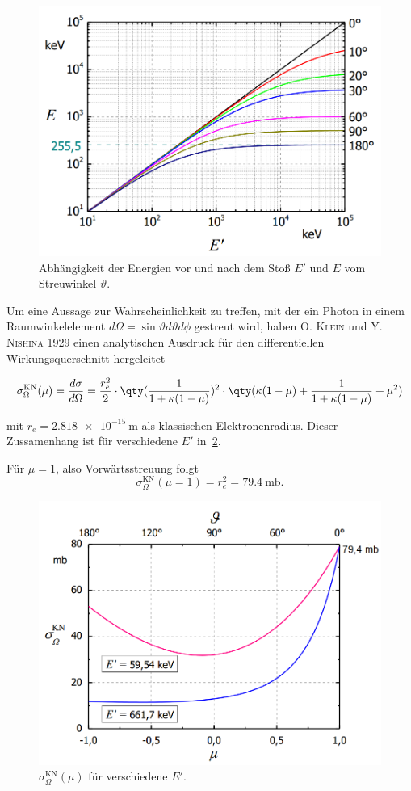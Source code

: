 \documentclass[slug=CS, room=Andreas-Schubert-Bau\,\ Labor\ 406,
supervisor=Juliane\ Volkmer, coursedate=29.\ 11.\ 2019]{../../Lab_Report_LaTeX/lab_report}
\begin{document}
\begin{figure}[H]\centering
        \includegraphics[width=.5\columnwidth]{./pictures/evontheta.png}
        \caption{Abhängigkeit der Energien vor und nach dem Stoß \(E'\) und \(E\) vom Streuwinkel
        \(\vartheta\).}
        \label{fig:evontheta}
\end{figure}

Um eine Aussage zur Wahrscheinlichkeit zu treffen, mit der ein Photon in einem Raumwinkelelement
\(d\Omega = \sin\vartheta d\vartheta d\phi\) gestreut wird, haben \textsc{O. Klein} und
\textsc{Y. Nishina} 1929 einen analytischen Ausdruck für den differentiellen Wirkungsquerschnitt
hergeleitet~\cite{kn29}

\begin{equation}\label{eq:kn}
        \sigma^{\text{KN}}_\Omega(\mu) = \frac{d\sigma}{d\Omega} = \frac{r_e^2}{2} \cdot \qty(\frac{1}{1 + \kappa(1 - \mu)})^2 \cdot \qty(\kappa(1 - \mu) + \frac{1}{1 + \kappa(1 - \mu)} + \mu^2)
\end{equation}

mit \(r_e = \SI{2,818e-15}{\metre}\) als klassischen Elektronenradius. Dieser Zussamenhang ist f\"ur verschiedene \(E'\) in~\ref{fig:sigmakn}.

Für \(\mu = 1\), also Vorwärtsstreuung folgt
\begin{equation}\label{key}
        \sigma^{\text{KN}}_\Omega(\mu = 1) = r_e^2 = \SI{79,4}{\milli\barn}.
\end{equation}

\begin{figure}[H]\centering
        \includegraphics[width=.5\columnwidth]{./pictures/sigma_kn.png}
        \caption{\(\sigma^{\text{KN}}_\Omega(\mu)\) für verschiedene \(E'\).}
        \label{fig:sigmakn}
\end{figure}
\end{document}
